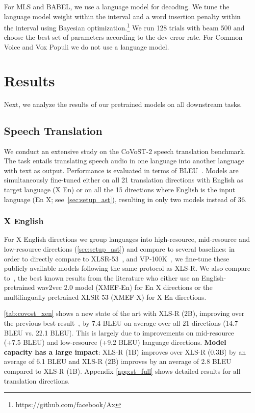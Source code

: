 \documentclass{article} \usepackage{iclr2022_conference,times}
\newcommand{\xlsrp}{XLS-R}
\newcommand{\xlsrpb}[1]{\xlsrp{} {(#1B)}}
\newcommand{\enx}{En  X}
\newcommand{\xen}{X  En}
\newcommand{\xenglish}{X  English}
\begin{document}
For MLS and BABEL, we use a language model for decoding.
We tune the language model weight within the interval  and a word insertion penalty within the interval  using Bayesian optimization.\footnote{https://github.com/facebook/Ax} 
We run 128 trials with beam 500 and choose the best set of parameters according to the dev error rate. 
For Common Voice and Vox Populi we do not use a language model.



\section{Results}
Next, we analyze the results of our pretrained models on all downstream tasks.


\subsection{Speech Translation}
We conduct an extensive study on the CoVoST-2 speech translation benchmark. 
The task entails translating speech audio in one language into another language with text as output. 
Performance is evaluated in terms of BLEU~\citep{papineni2002bleu}.
Models are simultaneously fine-tuned either on all 21 translation directions with English as target language (\xen{}) or on all the 15 directions where English is the input language (\enx{}; see~\textsection\ref{sec:setup_ast}), resulting in only two models instead of 36.

\subsubsection{\xenglish{}}
\label{sec:st_xen}

For \xenglish{} directions we group languages into high-resource, mid-resource and low-resource directions (\textsection\ref{sec:setup_ast}) and compare to several baselines: in order to directly compare to XLSR-53~\citep{conneau2021xlsr}, and VP-100K~\citep{wang2021voxpopuli}, we fine-tune these publicly available models following the same protocol as \xlsrp{}. 
We also compare to~\citet{li2021multilingual}, the best known results from the literature who either use an English-pretrained wav2vec 2.0 model (XMEF-En) for \enx{} directions or the multilingually pretrained XLSR-53 (XMEF-X) for \xen{} directions.

\autoref{tab:covost_xen} shows a new state of the art with \xlsrpb{2}, improving over the previous best result~\citep{li2021multilingual}, by 7.4 BLEU on average over all 21 directions (14.7 BLEU vs. 22.1 BLEU).
This is largely due to improvements on mid-resource (+7.5 BLEU) and low-resource (+9.2 BLEU) language directions.
\textbf{Model capacity has a large impact}: \xlsrpb{1} improves over \xlsrpb{0.3} by an average of 6.1 BLEU and \xlsrpb{2} improves by an average of 2.8 BLEU compared to \xlsrpb{1}.
Appendix \ref{app:st_full} shows detailed results for all translation directions. 
\end{document}
